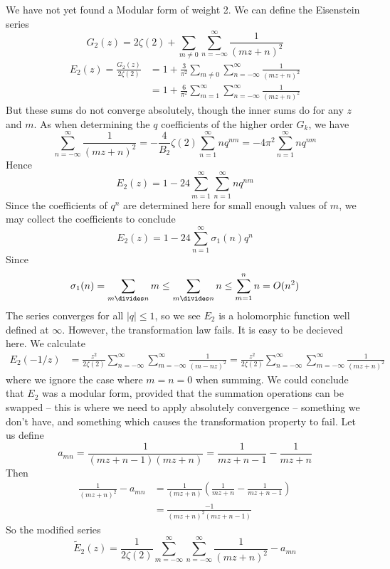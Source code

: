 We have not yet found a Modular form of weight 2. We can define the Eisenstein series
%
\[ G_2(z) = 2\zeta(2) + \sum_{m \neq 0} \sum_{n = - \infty}^\infty \frac{1}{(mz + n)^2} \]
%
\begin{align*}
    E_2(z) = \frac{G_2(z)}{2\zeta(2)} &= 1 + \frac{3}{\pi^2} \sum_{m \neq 0} \sum_{n = -\infty}^\infty \frac{1}{(mz + n)^2}\\
    &= 1 + \frac{6}{\pi^2} \sum_{m = 1}^\infty \sum_{n = -\infty}^\infty \frac{1}{(mz + n)^2}
\end{align*}
%
But these sums do not converge absolutely, though the inner sums do for any $z$ and $m$. As when determining the $q$ coefficients of the higher order $G_k$, we have
%
\[ \sum_{n = -\infty}^\infty \frac{1}{(mz + n)^2} = -\frac{4}{B_2} \zeta(2) \sum_{n = 1}^\infty n q^{nm} = - 4 \pi^2 \sum_{n = 1}^\infty n q^{nm} \]
%
Hence
%
\[ E_2(z) = 1 - 24 \sum_{m = 1}^\infty \sum_{n = 1}^\infty n q^{nm} \]
%
Since the coefficients of $q^n$ are determined here for small enough values of $m$, we may collect the coefficients to conclude
%
\[ E_2(z) = 1 - 24 \sum_{n = 1}^\infty \sigma_1(n) q^n \]
%
Since
%
\[ \sigma_1(n) = \sum_{m \divides n} m \leq \sum_{m \divides n} n \leq \sum_{m = 1}^n n = O(n^2) \]
%
The series converges for all $|q| \leq 1$, so we see $E_2$ is a holomorphic function well defined at $\infty$. However, the transformation law fails. It is easy to be decieved here. We calculate
%
\begin{align*}
    E_2(-1/z) &= \frac{z^2}{2 \zeta(2)} \sum_{n = -\infty}^\infty \sum_{m = -\infty}^\infty \frac{1}{(m - nz)^2} = \frac{z^2}{2 \zeta(2)} \sum_{n = -\infty}^\infty \sum_{m = -\infty}^\infty \frac{1}{(mz + n)^2}
\end{align*}
%
where we ignore the case where $m = n = 0$ when summing. We could conclude that $E_2$ was a modular form, provided that the summation operations can be swapped -- this is where we need to apply absolutely convergence -- something we don't have, and something which causes the transformation property to fail. Let us define
%
\[ a_{mn} = \frac{1}{(mz+n-1)(mz + n)} = \frac{1}{mz + n - 1} - \frac{1}{mz + n} \]
%
Then
%
\begin{align*}
    \frac{1}{(mz + n)^2} - a_{mn} &= \frac{1}{(mz + n)} \left( \frac{1}{mz + n} - \frac{1}{mz + n - 1} \right)\\
    &= \frac{-1}{(mz + n)^2 (mz + n - 1)}
\end{align*}
%
So the modified series
%
\[ \tilde{E}_2(z) = \frac{1}{2 \zeta(2)} \sum_{m = -\infty}^\infty \sum_{n = -\infty}^\infty \frac{1}{(mz + n)^2} - a_{mn} \]
